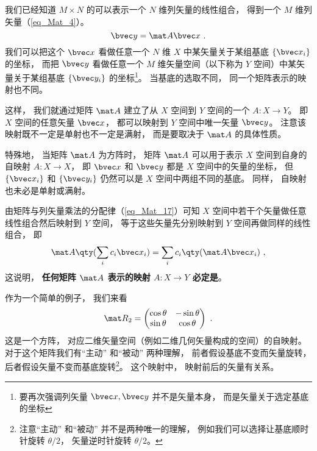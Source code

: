 


我们已经知道 $M\times N$ 的可以表示一个 $N$ 维列矢量的线性组合， 得到一个 $M$ 维列矢量（\autoref{eq_Mat_4}）。
\begin{equation}\label{eq_MatLS_1}
\bvec y = \mat A \bvec x~.
\end{equation}
我们可以把这个 $\bvec x$ 看做任意一个 $N$ 维 $X$ 中某矢量关于某组基底 $\{\bvec x_i\}$ 的坐标， 而把 $\bvec y$ 看做任意一个 $M$ 维矢量空间（以下称为 $Y$ 空间）中某矢量关于某组基底 $\{\bvec y_i\}$ 的坐标\footnote{要再次强调列矢量 $\bvec x, \bvec y$ 并不是矢量本身， 而是矢量关于选定基底的坐标}。 当基底的选取不同， 同一个矩阵表示的映射也不同。

这样， 我们就通过矩阵 $\mat A$ 建立了从 $X$ 空间到 $Y$ 空间的一个 $A:X\to Y$。 即 $X$ 空间的任意矢量 $\bvec x$， 都可以映射到 $Y$ 空间中唯一矢量 $\bvec y$。 注意该映射既不一定是单射也不一定是满射， 而是要取决于 $\mat A$ 的具体性质。

特殊地， 当矩阵 $\mat A$ 为方阵时， 矩阵 $\mat A$ 可以用于表示 $X$ 空间到自身的自映射 $A:X\to X$， 即 $\bvec x$ 和 $\bvec y$ 都是 $X$ 空间中的矢量的坐标， 但 $\{\bvec x_i\}$ 和 $\{\bvec y_i\}$ 仍然可以是 $X$ 空间中两组不同的基底。 同样， 自映射也未必是单射或满射。

由矩阵与列矢量乘法的分配律（\autoref{eq_Mat_17}）可知 $X$ 空间中若干个矢量做任意线性组合然后映射到 $Y$ 空间， 等于这些矢量先分别映射到 $Y$ 空间再做同样的线性组合， 即
\begin{equation}
\mat A \qty(\sum_i c_i \bvec x_i) = \sum_i c_i \qty(\mat A \bvec x_i)~,
\end{equation}
这说明， \textbf{任何矩阵 $\mat A$ 表示的映射 $A:X\to Y$ 必定是}。

作为一个简单的例子， 我们来看
\begin{equation}
\mat R_2 = \begin{pmatrix}
\cos\theta & - \sin\theta\\
\sin\theta &\cos\theta   
\end{pmatrix}~.
\end{equation}
这是一个方阵， 对应二维矢量空间（例如二维几何矢量构成的空间）的自映射。 对于这个矩阵我们有“主动” 和“被动” 两种理解， 前者假设基底不变而矢量旋转， 后者假设矢量不变而基底旋转\footnote{注意“主动” 和“被动” 并不是两种唯一的理解， 例如我们可以选择让基底顺时针旋转 $\theta/2$， 矢量逆时针旋转 $\theta/2$。}。 这个映射中， 映射前后的矢量有关系。

